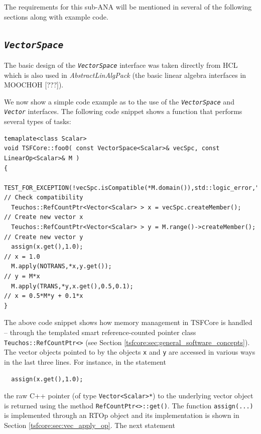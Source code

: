 The requirements for this sub-ANA will be mentioned in several of the
following sections along with example code.

%
\subsection{\texttt{\textit{VectorSpace}}}
\label{tsfcore:sec:vec_space}
%

The basic design of the {}\texttt{\textit{VectorSpace}} interface was
taken directly from HCL which is also used in
{}\textit{AbstractLinAlgPack} (the basic linear algebra interfaces in
MOOCHOH [???]).

We now show a simple code example as to the use of the
{}\texttt{\textit{VectorSpace}} and {}\texttt{\textit{Vector}}
interfaces.  The following code snippet shows a function that performs
several types of tasks:

{\scriptsize\begin{verbatim}
temaplate<class Scalar>
void TSFCore::foo0( const VectorSpace<Scalar>& vecSpc, const LinearOp<Scalar>& M )
{
  TEST_FOR_EXCEPTION(!vecSpc.isCompatible(*M.domain()),std::logic_error,"Error!"); // Check compatibility
  Teuchos::RefCountPtr<Vector<Scalar> > x = vecSpc.createMember();                 // Create new vector x
  Teuchos::RefCountPtr<Vector<Scalar> > y = M.range()->createMember();             // Create new vector y
  assign(x.get(),1.0);                                                             // x = 1.0
  M.apply(NOTRANS,*x,y.get());                                                     // y = M*x
  M.apply(TRANS,*y,x.get(),0.5,0.1);                                               // x = 0.5*M*y + 0.1*x
}
\end{verbatim}}

{}\noindent{}The above code snippet shows how memory management in
TSFCore is handled -- through the templated smart reference-counted
pointer class {}\texttt{Teuchos\-::RefCountPtr<>} (see Section
{}\ref{tsfcore:sec:general_software_concepts}).  The vector objects
pointed to by the objects {}\texttt{x} and {}\texttt{y} are accessed
in various ways in the last three lines.  For instance, in the
statement

{\scriptsize\begin{verbatim}
  assign(x.get(),1.0);
\end{verbatim}}

{}\noindent{}the raw C++ pointer (of type {}\texttt{Vector<Scalar>*})
to the underlying vector object is returned using the method
{}\texttt{RefCountPtr<>\-::get()}.  The function
{}\texttt{assign(...)} is implemented through an RTOp object and its
implementation is shown in Section {}\ref{tsfcore:sec:vec_apply_op}.
The next statement

